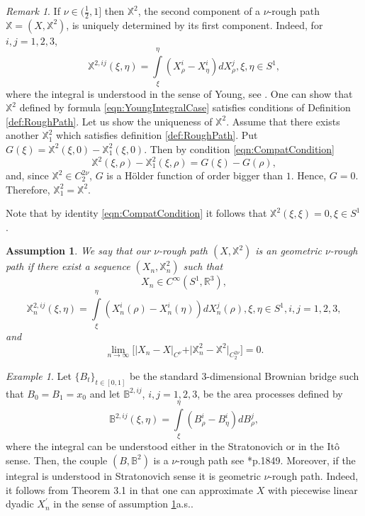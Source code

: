 \documentclass[11pt,a4paper,leqno]{amsart}%
\theoremstyle{plain}
\theoremstyle{remark}
\newtheorem{remark}[theorem]{Remark}
\newtheorem{example}[theorem]{Example}
\theoremstyle{plain}
\newtheorem{assumption}[theorem]{Assumption}
\numberwithin{equation}{section}
\def\Rnu{{\mathbb R}}
\def\intl{\int\limits}
\begin{document}
\begin{remark}
If $\nu\in(\frac{1}{2},1]$ then $\mathbb{X}^2$, the second
component of a $\nu$-rough path $\mathbb{X}=(X,\mathbb{X}^2)$, is
uniquely determined by its first component. Indeed, for $i,j=1,2,3$, 
\begin{equation}
\mathbb{X}^{2,ij}(\xi,\eta)=\intl_{\xi}^{\eta}(X^i_{\rho}-X^i_{\eta})dX^j_{\rho},\xi,\eta\in
S^1,\label{eqn:YoungIntegralCase}
\end{equation}
where the integral is understood in the sense of Young, see
\cite{[Young-1936]}. One can show that $\mathbb{X}^{2}$ defined by
formula \eqref{eqn:YoungIntegralCase} satisfies conditions of
Definition \ref{def:RoughPath}. Let us show the uniqueness of
$\mathbb{X}^{2}$. Assume that there exists another
$\mathbb{X}_1^{2}$ which satisfies definition \ref{def:RoughPath}.
Put $G(\xi)=\mathbb{X}^{2}(\xi,0)-\mathbb{X}_1^{2}(\xi,0)$. Then
by condition \ref{eqn:CompatCondition}
$$
\mathbb{X}^{2}(\xi,\rho)-\mathbb{X}_1^{2}(\xi,\rho)=G(\xi)-G(\rho),
$$
and, since $\mathbb{X}^{2}\in C_2^{2\nu}$, $G$ is a H\"{o}lder
function of order bigger  than $1$. Hence,  $G=0$. Therefore,
$\mathbb{X}_1^{2}=\mathbb{X}^{2}$.
\end{remark}
Note that by identity \eqref{eqn:CompatCondition} it follows that
$\mathbb{X}^2(\xi,\xi)=0,\xi\in S^1$.
\begin{assumption}\label{ass:RoughPathApproximability}
We say that our $\nu$-rough path $(X,\mathbb{X}^2)$  is an
geometric $\nu$-rough path if there exist a sequence
$(X_n,\mathbb{X}_n^2)$ such that
$$
X_n\in C^{\infty}(S^1,\Rnu^3),
$$
$$
\mathbb{X}_n^{2,ij}(\xi,\eta)=\intl_{\xi}^{\eta}(X_n^i({\rho})-X_n^i({\eta}))dX_n^j({\rho}),\xi,\eta\in
S^1,i,j=1,2,3,
$$
and
\begin{equation}
\lim_{n\to\infty}\big[\vert X_n-X\vert_{C^{\nu}}+\vert \mathbb{X}_n^2-\mathbb{X}^2\vert_{C_2^{2\nu}}\big]=
0.\label{eqn:RoughPathTopology}
\end{equation}
\end{assumption}
\begin{example}
Let $\{B_t\}_{t\in [0,1]}$ be the standard $3$-dimensional Brownian
bridge such that $B_0=B_1=x_0$ and let $\mathbb{B}^{2,ij}$, $i,j=1,2,3$,  be the
area processes defined by
$$
\mathbb{B}^{2,ij}(\xi,\eta)=\intl_{\xi}^{\eta}(B^i_{\rho}-B^i_{\eta})dB^j_{\rho},
$$
where the integral can be understood either in the Stratonovich or in the It\^o
sense. Then, the couple $(B,\mathbb{B}^2)$ is a $\nu$-rough path see \cite{[Bess+Gub_2005]}*{p.1849}. Moreover, if the integral is understood in Stratonovich sense it is
geometric $\nu$-rough path.  Indeed, it follows from Theorem
3.1 in \cite{[Friz-2005]} that one can approximate $X$ with
piecewise linear dyadic $X_n^\prime$ in the sense of assumption
\ref{ass:RoughPathApproximability}a.s..
\end{example}
\end{document}
